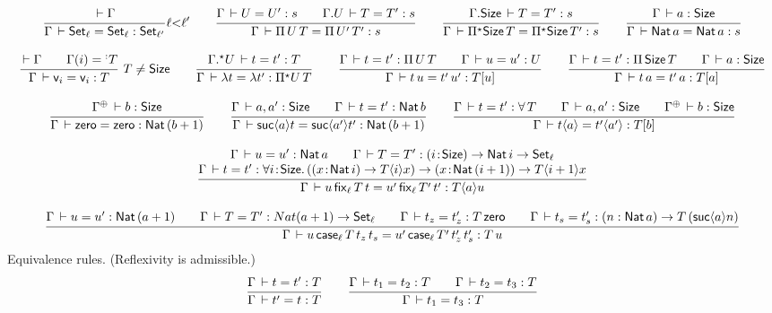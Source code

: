 \documentclass[acmlarge,review,anonymous]{acmart}\settopmatter{printfolios=true}
\begin{document}
\begin{gather*}
  \ru{\der \Gamma
    }{\Gamma \der \Set[\ell] = \Set[\ell]: \Set[\ell']
    }{\ell {<} \ell'}
\qquad
  \ru{\Gamma \der U = U' : s \qquad
      \cext \Gamma U \der T = T' : s
    }{\Gamma \der \piT U T = \piT{U'}T': s}
\qquad
  \ru{\cext \Gamma \Size \der T = T' : s
    }{\Gamma \der \epiT \Size T = \epiT \Size T' : s}
\qquad
  \ru{%
      \Gamma \der a : \Size
    }{\Gamma \der \Nat a = \Nat a : s}
\\[2ex]
  \rux{\der \Gamma \qquad \Gamma(i) = \erann[\noterased] T
    }{\Gamma \der \ind i = \ind i : T
    }{T \not= \Size}
\qquad
  \ru{\eext \Gamma U \der t = t' : T
    }{\Gamma \der \lambda t = \lambda t' : \epiT U T}
\qquad
  \ru{\Gamma \der t = t' : \piT U T \qquad
      \Gamma \der u = u' : U
    }{\Gamma \der t\,u = t'\,u' : T[u]}
\qquad
  \ru{\Gamma \der t = t' : \piT \Size T \qquad
      \Gamma \der a : \Size
    }{\Gamma \der t\,a = t'\,a : T[a]}
\\[2ex] %
  \ru{\resurrect\Gamma \der b : \Size
    }{\Gamma \der \tzero = \tzero : \Nat (b + 1)}
\qquad
  \ru{\Gamma \der a, a' : \Size \qquad
      \Gamma \der t = t' : \Nat b
    }{\Gamma \der \suc a t = \suc {a'} t' : \Nat (b + 1)}
\qquad
  \ru{\Gamma \der t = t' : \forallT T \qquad
      \Gamma \der a, a' : \Size \qquad
      \resurrect\Gamma \der b : \Size
    }{\Gamma \der t \ann a = t' \ann{a'} : T[b]}
\\[2ex]
  \ru{\Gamma \der u = u' : \Nat a \qquad
      \Gamma \der T = T' : \funT i \Size \Nat i \to \Set[\ell] \\
      \Gamma \der t = t' : \allT i \Size (\funT x {\Nat i} T \ann i x) \to \funT x {\Nat (i + 1)} T \ann{i+1} x
     }{\Gamma \der u\,\fix[\ell] T t = u'\,\fix[\ell] {T'} t' : T \ann a u}
\\[2ex]
  \ru{\Gamma \der u = u' : \Nat (a + 1) \qquad
      \Gamma \der T = T' : Nat (a + 1) \to \Set[\ell] \qquad
      \Gamma \der t_z = t_z' : T \, \tzero \qquad
      \Gamma \der t_s = t_s' : (n : \Nat a) \to T \, (\suc a n)
    }{\Gamma \der u\,\case[\ell] T {t_z} t_s = u'\,\case[\ell] {T'} {t_z'} t_s' : T \, u}
\end{gather*}
Equivalence rules.  (Reflexivity is admissible.)
\begin{gather*}
  \ru{\Gamma \der t = t' : T
    }{\Gamma \der t' = t : T}
\qquad
  \ru{\Gamma \der t_1 = t_2 : T \qquad
      \Gamma \der t_2 = t_3 : T
    }{\Gamma \der t_1 = t_3 : T}
\end{gather*}
\end{document}
